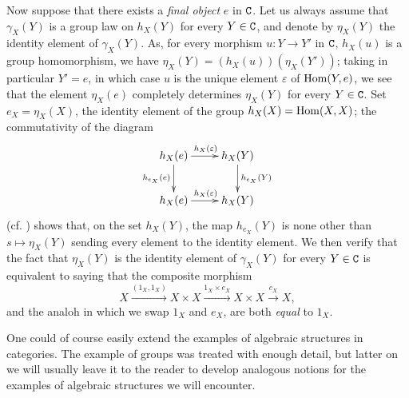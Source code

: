 \begin{env}[8.2.7]
\label{0.8.2.7}
Now suppose that there exists a \emph{final object} $e$  in $\mathtt{C}$.
Let us always assume that $\gamma_X(Y)$ is a group law on $h_X(Y)$ for every $Y\in\mathtt{C}$, and denote by $\eta_X(Y)$ the identity element of $\gamma_X(Y)$.
As, for every morphism $u:Y\to Y'$ in $\mathtt{C}$, $h_X(u)$ is a group homomorphism, we have $\eta_X(Y)=(h_X(u))(\eta_X(Y'))$; taking in particular $Y'=e$, in which case $u$ is the unique element $\varepsilon$ of ${\mathop{\mathrm{Hom}}\nolimits}(Y,e)$, we see that the element $\eta_X(e)$ completely determines $\eta_X(Y)$ for every $Y\in\mathtt{C}$.
Set $e_X=\eta_X(X)$, the identity element of the group $h_X(X)={\mathop{\mathrm{Hom}}\nolimits}(X,X)$; the commutativity of the diagram
\[
  \xymatrix{
    h_X(e)\ar[r]^{h_X(\varepsilon)}\ar[d]_{h_{e_X}(e)} &
    h_X(Y)\ar[d]^{h_{e_X}(Y)}\\
    h_X(e)\ar[r]^{h_X(\varepsilon)} &
    h_X(Y)
  }
\]
(cf. ) shows that, on the set $h_X(Y)$, the map $h_{e_X}(Y)$ is none other than
$s\mapsto\eta_X(Y)$ sending every element to the identity element.
We then verify that the fact that $\eta_X(Y)$ is the identity element of $\gamma_X(Y)$ for every $Y\in\mathtt{C}$ is equivalent to saying that the composite morphism
\[
  X\xrightarrow{(1_X,1_X)}X\times X\xrightarrow{1_X\times e_X}X\times X\xrightarrow{c_X}X,
\]
and the analoh in which we swap $1_X$ and $e_X$, are both \emph{equal} to $1_X$.
\end{env}

\begin{env}[8.2.8]
\label{0.8.2.8}
One could of course easily extend the examples of algebraic structures in categories.
The example of groups was treated with enough detail, but latter on we will usually leave it to the reader to develop analogous notions for the examples of algebraic structures we will encounter.
\end{env}
